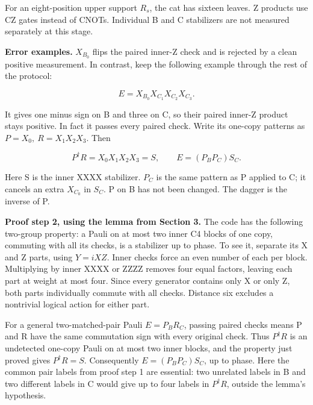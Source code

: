 \documentclass[11pt]{article}
\begin{document}
\begin{center}\begin{minipage}{\linewidth}

\end{minipage}\end{center}

For an eight-position upper support \(R_s\), the cat has sixteen leaves. Z products use CZ gates instead of CNOTs. Individual B and C stabilizers are not measured separately at this stage.

\textbf{Error examples.} \(X_{B_0}\) flips the paired inner-Z check and is rejected by a clean positive measurement. In contrast, keep the following example through the rest of the protocol:

\[
E=X_{B_0}X_{C_1}X_{C_2}X_{C_3}.
\]

It gives one minus sign on B and three on C, so their paired inner-Z product stays positive. In fact it passes every paired check. Write its one-copy patterns as \(P=X_0,\ R=X_1X_2X_3\). Then

\[
P^\dagger R=X_0X_1X_2X_3=S,\qquad
E=(P_BP_C)S_C.
\]

Here S is the inner XXXX stabilizer. \(P_C\) is the same pattern as P applied to C; it cancels an extra \(X_{C_0}\) in \(S_C\). P on B has not been changed. The dagger is the inverse of P.

\textbf{Proof step 2, using the lemma from Section 3.} The code has the following two-group property: a Pauli on at most two inner C4 blocks of one copy, commuting with all its checks, is a stabilizer up to phase. To see it, separate its X and Z parts, using \(Y=iXZ\). Inner checks force an even number of each per block. Multiplying by inner XXXX or ZZZZ removes four equal factors, leaving each part at weight at most four. Since every generator contains only X or only Z, both parts individually commute with all checks. Distance six excludes a nontrivial logical action for either part.

For a general two-matched-pair Pauli \(E=P_BR_C\), passing paired checks means P and R have the same commutation sign with every original check. Thus \(P^\dagger R\) is an undetected one-copy Pauli on at most two inner blocks, and the property just proved gives \(P^\dagger R=S\). Consequently \(E=(P_BP_C)S_C\), up to phase. Here the common pair labels from proof step 1 are essential: two unrelated labels in B and two different labels in C would give up to four labels in \(P^\dagger R\), outside the lemma's hypothesis.
\end{document}
